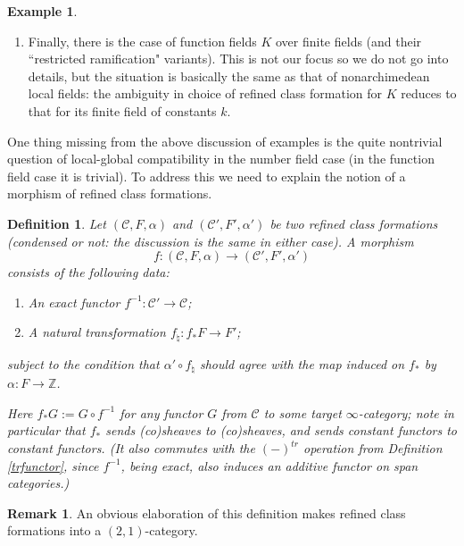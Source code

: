 \documentclass[12pt]{article}
\newtheorem{definition}[theorem]{Definition}
\theoremstyle{definition}
\newtheorem{example}[theorem]{Example}
\newtheorem{remark}[theorem]{Remark}
\newcommand{\mc}{\mathcal}
\newcommand{\mbb}{\mathbb}
\begin{document}
\begin{example}
\begin{enumerate}
\item Finally, there is the case of function fields $K$ over finite fields (and their ``restricted ramification" variants).  This is not our focus so we do not go into details, but the situation is basically the same as that of nonarchimedean local fields: the ambiguity in choice of refined class formation for $K$ reduces to that for its finite field of constants $k$.
\end{enumerate}

\end{example}


One thing missing from the above discussion of examples is the quite nontrivial question of local-global compatibility in the number field case (in the function field case it is trivial). To address this we need to explain the notion of a morphism of refined class formations.

\begin{definition}\label{maprcf}
Let $(\mc{C},F,\alpha)$ and $(\mc{C}',F',\alpha')$ be two refined class formations (condensed or not: the discussion is the same in either case).  A morphism 
$$f:(\mc{C},F,\alpha)\to (\mc{C}',F',\alpha')$$
consists of the following data:
\begin{enumerate}
\item An exact functor $f^{-1}:\mc{C}'\to\mc{C}$;
\item A natural transformation $f_\natural: f_\ast F \to F'$;
\end{enumerate}
subject to the condition that $\alpha'\circ f_\natural$ should agree with the map induced on $f_\ast$ by $\alpha:F\to\mbb{Z}$.

Here $f_\ast G := G\circ f^{-1}$ for any functor $G$ from $\mc{C}$ to some target $\infty$-category; note in particular that $f_\ast$ sends (co)sheaves to (co)sheaves, and sends constant functors to constant functors.  (It also commutes with the $(-)^{tr}$ operation from Definition \ref{trfunctor}, since $f^{-1}$, being exact, also induces an additive functor on span categories.)
\end{definition}

\begin{remark}
An obvious elaboration of this definition makes refined class formations into a $(2,1)$-category.
\end{remark}
\end{document}
